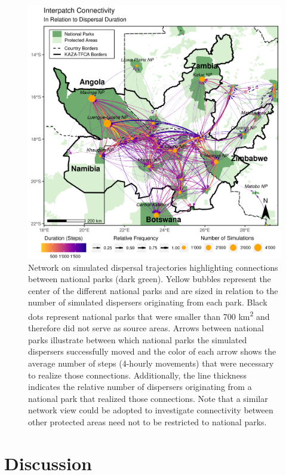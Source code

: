 \documentclass[abstract=on,10pt,a4paper,bibliography=totocnumbered]{article}
\begin{document}
\begin{figure}
  \includegraphics[width=\textwidth]{99_AreasReached.png}
  \caption{Network on simulated dispersal trajectories highlighting connections
  between national parks (dark green). Yellow bubbles represent the center of
  the different national parks and are sized in relation to the number of
  simulated dispersers originating from each park. Black dots represent national
  parks that were smaller than 700 km\textsuperscript{2} and therefore did not
  serve as source areas. Arrows between national parks illustrate between which
  national parks the simulated dispersers successfully moved and the color of
  each arrow shows the average number of steps (4-hourly movements) that were
  necessary to realize those connections. Additionally, the line thickness
  indicates the relative number of dispersers originating from a national park
  that realized those connections. Note that a similar network view could be
  adopted to investigate connectivity between other protected areas need not to
  be restricted to national parks.}
  \label{AreasReached}
\end{figure}

\section{Discussion}
\end{document}
